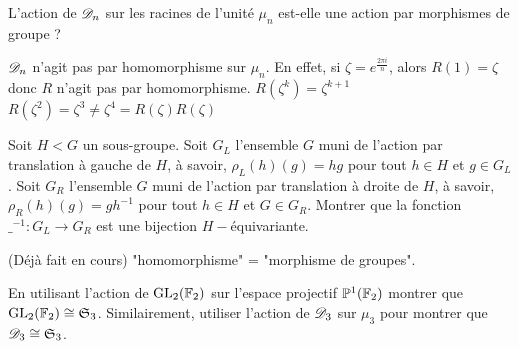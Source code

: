 \documentclass[french,a4paper,10pt]{article}
\begin{document}
	\begin{td-exo}
		L'action de $\mathscr{D}_n$ sur les racines de l'unité $\mu_n$ est-elle une action 
		par morphismes de groupe ?
	\end{td-exo}
	\begin{td-sol}
		$\mathscr{D}_n$ n'agit pas par homomorphisme sur $\mu_n$. En effet, si 
		$\zeta = e^{\frac{2\pi i}{n}}$, alors $R(1) = \zeta$ donc $R$ n'agit pas 
		par homomorphisme. $R(\zeta^k) = \zeta^{k+1}$ $R(\zeta^2) = \zeta^3 \neq \zeta^4
		= R(\zeta)R(\zeta)$ 
	\end{td-sol}
	\begin{td-exo}
		Soit $H < G$ un sous-groupe. Soit $G_L$ l'ensemble $G$ muni de l'action 
		par translation à gauche de $H$, à savoir, $\rho_L(h)(g) = hg$ pour 
		tout $h\in H$ et $g\in G_L$. Soit $G_R$ l'ensemble $G$ muni de l'action 
		par translation à droite de $H$, à savoir, $\rho_R(h)(g) = gh^{-1}$ pour 
		tout $h\in H$ et $G\in G_R$. Montrer que la fonction ${\_}^{-1}: G_L \to G_R$ 
		est une bijection $H-$équivariante.
	\end{td-exo}
	\begin{td-sol}
		(Déjà fait en cours) "homomorphisme" = "morphisme de groupes".
	\end{td-sol}
	\begin{td-exo}
		En utilisant l'action de $\text{GL}_{2}(\mathbb{F}_2)$ sur l'espace projectif $\mathbb{P}^1(\mathbb{F}_2)$ 
		montrer que $\text{GL}_{2}(\mathbb{F}_2) \cong \mathfrak{S}_3$. Similairement, utiliser
		l'action de $\mathscr{D}_3$ sur $\mu_3$ pour montrer que $\mathscr{D}_3 \cong \mathfrak{S}_3$.
	\end{td-exo}
\end{document}
